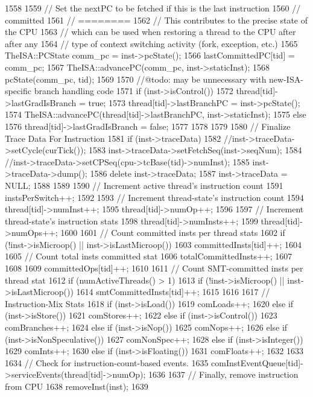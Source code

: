 \begin{DoxyCode}
1558 {
1559     // Set the nextPC to be fetched if this is the last instruction
1560     // committed
1561     // ========
1562     // This contributes to the precise state of the CPU
1563     // which can be used when restoring a thread to the CPU after after any
1564     // type of context switching activity (fork, exception, etc.)
1565     TheISA::PCState comm_pc = inst->pcState();
1566     lastCommittedPC[tid] = comm_pc;
1567     TheISA::advancePC(comm_pc, inst->staticInst);
1568     pcState(comm_pc, tid);
1569 
1570     //@todo: may be unnecessary with new-ISA-specific branch handling code
1571     if (inst->isControl()) {
1572         thread[tid]->lastGradIsBranch = true;
1573         thread[tid]->lastBranchPC = inst->pcState();
1574         TheISA::advancePC(thread[tid]->lastBranchPC, inst->staticInst);
1575     } else {
1576         thread[tid]->lastGradIsBranch = false;
1577     }
1578         
1579 
1580     // Finalize Trace Data For Instruction
1581     if (inst->traceData) {
1582         //inst->traceData->setCycle(curTick());
1583         inst->traceData->setFetchSeq(inst->seqNum);
1584         //inst->traceData->setCPSeq(cpu->tcBase(tid)->numInst);
1585         inst->traceData->dump();
1586         delete inst->traceData;
1587         inst->traceData = NULL;
1588     }
1589 
1590     // Increment active thread's instruction count
1591     instsPerSwitch++;
1592     
1593     // Increment thread-state's instruction count
1594     thread[tid]->numInst++;
1595     thread[tid]->numOp++;
1596 
1597     // Increment thread-state's instruction stats
1598     thread[tid]->numInsts++;
1599     thread[tid]->numOps++;
1600 
1601     // Count committed insts per thread stats
1602     if (!inst->isMicroop() || inst->isLastMicroop()) {
1603         committedInsts[tid]++;
1604 
1605         // Count total insts committed stat
1606         totalCommittedInsts++;
1607     }
1608 
1609     committedOps[tid]++;
1610 
1611     // Count SMT-committed insts per thread stat
1612     if (numActiveThreads() > 1) {
1613         if (!inst->isMicroop() || inst->isLastMicroop())
1614             smtCommittedInsts[tid]++;
1615     }
1616 
1617     // Instruction-Mix Stats
1618     if (inst->isLoad()) {
1619         comLoads++;
1620     } else if (inst->isStore()) {
1621         comStores++;
1622     } else if (inst->isControl()) {
1623         comBranches++;
1624     } else if (inst->isNop()) {
1625         comNops++;
1626     } else if (inst->isNonSpeculative()) {
1627         comNonSpec++;
1628     } else if (inst->isInteger()) {
1629         comInts++;
1630     } else if (inst->isFloating()) {
1631         comFloats++;
1632     }
1633 
1634     // Check for instruction-count-based events.
1635     comInstEventQueue[tid]->serviceEvents(thread[tid]->numOp);
1636 
1637     // Finally, remove instruction from CPU
1638     removeInst(inst);
1639 }
\end{DoxyCode}
